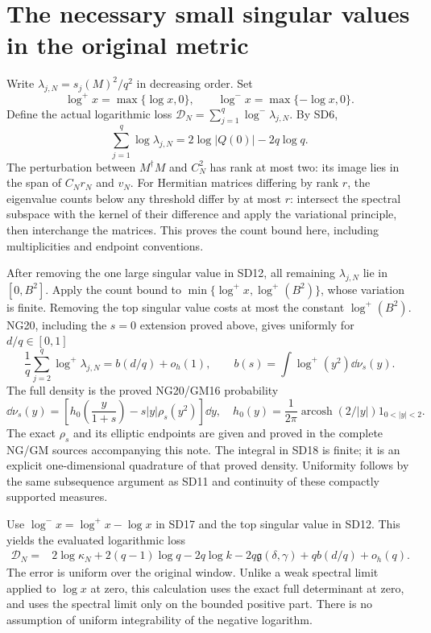 \documentclass[11pt]{article}
\begin{document}
\section{The necessary small singular values in the original metric}
Write $\lambda_{j,N}=s_j(M)^2/q^2$ in decreasing order. Set
\[
\log^+x=\max\{\log x,0\},\qquad \log^-x=\max\{-\log x,0\}.
\]
Define the actual logarithmic loss
$\mathcal D_N=\sum_{j=1}^q\log^-\lambda_{j,N}$.
By SD6,
\begin{equation}\tag{SD17}
\sum_{j=1}^q\log\lambda_{j,N}=2\log|Q(0)|-2q\log q.
\end{equation}
The perturbation between $M^\dagger M$ and $C_N^2$ has rank at most
two: its image lies in the span of $C_Nr_N$ and $v_N$.
For Hermitian matrices differing by rank $r$, the eigenvalue counts
below any threshold differ by at most $r$: intersect the spectral
subspace with the kernel of their difference and apply the variational
principle, then interchange the matrices. This proves the count bound
here, including multiplicities and endpoint conventions.

After removing the one large singular value in SD12, all remaining
$\lambda_{j,N}$ lie in $[0,B^2]$. Apply the count bound to
$\min\{\log^+x,\log^+(B^2)\}$, whose variation is finite. Removing
the top singular value costs at most the constant $\log^+(B^2)$.
NG20, including the $s=0$
extension proved above, gives uniformly for $d/q\in[0,1]$
\begin{equation}\tag{SD18}
\frac1q\sum_{j=2}^q\log^+\lambda_{j,N}
=b(d/q)+o_h(1),\qquad
b(s)=\int\log^+(y^2)\dd\nu_s(y).
\end{equation}
The full density is the proved NG20/GM16 probability
\[
\dd\nu_s(y)=\left[h_0\left(\frac y{1+s}\right)
-s|y|\rho_s(y^2)\right]\dd y,\quad
h_0(y)=\frac1{2\pi}\operatorname{arcosh}(2/|y|)1_{0<|y|<2}.
\]
The exact $\rho_s$ and its elliptic endpoints are given and proved in
the complete NG/GM sources accompanying this note. The integral in
SD18 is finite; it is an explicit one-dimensional quadrature of that
proved density. Uniformity follows by the same subsequence argument
as SD11 and continuity of these compactly supported measures.

Use $\log^-x=\log^+x-\log x$ in SD17 and the top singular value in
SD12. This yields the evaluated logarithmic loss
\begin{equation}\tag{SD19}
\boxed{\begin{aligned}
\mathcal D_N={}&2\log\kappa_N+2(q-1)\log q-2q\log k
-2q\mathfrak g(\delta,\gamma)+qb(d/q)+o_h(q).
\end{aligned}}
\end{equation}
The error is uniform over the original window. Unlike a weak spectral
limit applied to $\log x$ at zero, this calculation uses the exact
full determinant at zero, and uses the spectral limit only on the
bounded positive part. There is no assumption of uniform integrability
of the negative logarithm.
\end{document}
